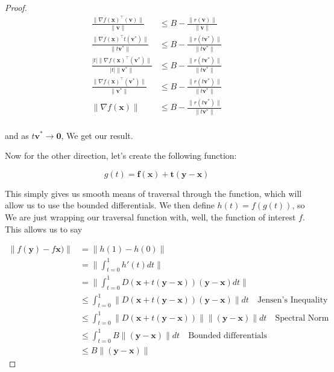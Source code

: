 \documentclass{article}
\begin{document}
\begin{proof}
			\begin{align*}
				\frac{\| \nabla f\mathbf{(x)^\top(v)} \|}{\| \mathbf{v} \|}  &\le B - \frac{\| r(\mathbf{v})  \|}{\| \mathbf{v} \|}  \\
				\frac{\| \nabla f\mathbf{(x)} ^\top t\mathbf{(v^*)} \|}{\| t  \mathbf{v^*} \|}  &\le B - \frac{\|  r(t\mathbf{v^*})  \|}{\| t\mathbf{v^*} \|}  \\
				\frac{ |t| \| \nabla f\mathbf{(x)^\top(v^*)} \|}{ |t| \| \mathbf{v^*} \|}  &\le B - \frac{\|  r(t\mathbf{v^*})  \|}{\| t\mathbf{v^*} \|}  \\
				\frac{  \| \nabla f\mathbf{(x)^\top(v^*)} \|}{  \| \mathbf{v^*} \|}  &\le B - \frac{\|  r(t\mathbf{v^*})  \|}{\| t\mathbf{v^*} \|}  \\
				 \| \nabla f\mathbf{(x)} \|  &\le B - \frac{\|  r(t\mathbf{v^*})  \|}{\| t\mathbf{v^*} \|}  \\
			\end{align*}
			
			and as $t\mathbf{v^*}\to\mathbf{0}$, We get our result.
			
			Now for  the other direction, let's create the following function:
			
			\[ g(t) = \mathbf{f(x) + t(y-x)} \]
			
			This simply gives us smooth means of traversal through the function, which will allow us to use the bounded differentials. We then define $h(t) = f(g(t))$, so We are just wrapping our traversal function with, well, the function of interest $f$. This allows us to say
			
			\begin{align*}
				\|f(\mathbf{y}) - f\mathbf{x})\| &= \| h(1) - h(0) \| \\
				&= \bigg\| \int^1_{t=0} h'(t) dt \bigg\| \\
				&= \bigg\| \int^1_{t=0} D(\mathbf{x} + t(\mathbf{y-x}))(\mathbf{y-x}) dt \bigg\| \\
				&\le  \int^1_{t=0}  \| D(\mathbf{x} + t(\mathbf{y-x}))(\mathbf{y-x}) \| dt\quad\text{Jensen's Inequality} \\
				&\le  \int^1_{t=0}  \| D(\mathbf{x} + t(\mathbf{y-x})) \| \| (\mathbf{y-x}) \| dt\quad\text{Spectral Norm} \\
				&\le  \int^1_{t=0}  B \| (\mathbf{y-x}) \| dt\quad\text{Bounded differentials} \\
				&\le   B \| (\mathbf{y-x}) \| 
			\end{align*}
		\end{proof}
		
\end{document}
